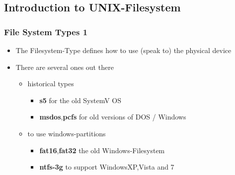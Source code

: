 \documentclass[draft,handout]{beamer}
\begin{document}
	\subsection{Introduction to UNIX-Filesystem}
	    \begin{frame}
			\frametitle{File System Types 1}
			\begin{itemize}
                \item<1-> The Filesystem-Type defines how to use (speak to) the physical device
                \item<1-> There are several ones out there
                \begin{itemize}
                    \item<2-> historical types
                    \begin{itemize}
                        \item<2-> \textbf{s5} for the old SystemV OS
                        \item<2-> \textbf{msdos},\textbf{pcfs} for old versions of DOS / Windows
                    \end{itemize}
                    \item<3-> to use windows-partitions
                    \begin{itemize}
                        \item<3-> \textbf{fat16},\textbf{fat32} the old Windows-Filesystem
                        \item<3-> \textbf{ntfs-3g} to support WindowsXP,Vista and 7
                    \end{itemize}
                \end{itemize}
            \end{itemize}
        \end{frame}
\end{document}
